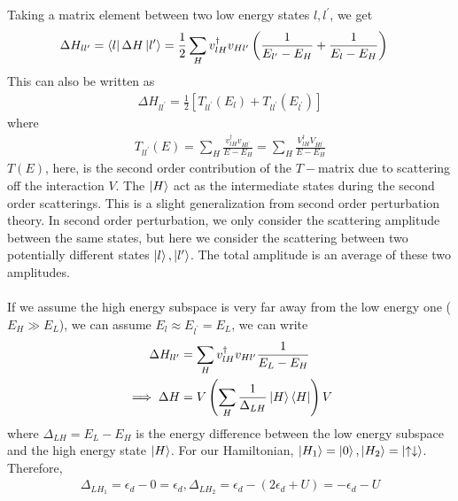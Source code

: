 \documentclass[twoside,11pt]{report}
\numberwithin{equation}{section}
\begin{document}
Taking a matrix element between two low energy states \(l, l^\prime\), we get
\begin{equation}\begin{aligned}
	\Delta H_{ll^\prime} = \bra{l} \Delta H \ket{l^\prime} &= \frac{1}{2}\sum_H v^\dagger_{lH}v_{Hl^\prime}\left(\frac{1}{E_{l^\prime} - E_H}+\frac{1}{E_l - E_H}\right)
\end{aligned}\end{equation}
This can also be written as
\begin{equation}\begin{aligned}
	\label{hamtmat}
	\Delta H_{ll^\prime} = \frac{1}{2}\left[T_{ll^\prime}(E_l) + T_{ll^\prime}(E_{l^\prime})\right]
\end{aligned}\end{equation}
where 
\begin{equation}\begin{aligned}
T_{ll^\prime}(E) = \sum_H \frac{v^\dagger_{lH}v_{Hl^\prime}}{E-E_H} = \sum_H \frac{V^\dagger_{lH} V_{Hl^\prime}}{E-E_H}
\end{aligned}\end{equation}
\(T(E)\), here, is the second order contribution of the \(T-\)matrix due to scattering off the interaction \(V\).
The \(\ket{H}\) act as the intermediate states during the second order scatterings.
This is a slight generalization from second order perturbation theory.
In second order perturbation, we only consider the scattering amplitude between the same states, but here we consider the scattering between two potentially different states \(\ket{l},\ket{l^\prime}\).
The total amplitude is an average of these two amplitudes.
\\\\If we assume the high energy subspace is very far away from the low energy one (\(E_H \gg E_L\)), we can assume \(E_l \approx E_{l^\prime} = E_L\), we can write
\begin{equation}\begin{aligned}
\Delta H_{ll^\prime} &=\sum_H v^\dagger_{lH}v_{Hl^\prime}\frac{1}{E_L-E_H}\\
\implies \Delta H &=V \left(\sum_H \frac{1}{\Delta_{LH}}\ket{H}\bra{H}\right)V
\end{aligned}\end{equation}
where \(\Delta_{LH}=E_L - E_H\) is the energy difference between the low energy subspace and the high energy state \(\ket{H}\).
For our Hamiltonian, \(\ket{H_1} = \ket{0}, \ket{H_2} = \ket{\uparrow\downarrow}\).
Therefore,
\begin{equation}\begin{aligned}
	\Delta_{LH_1} = \epsilon_d - 0 = \epsilon_d, \Delta_{LH_2} = \epsilon_d - \left(2\epsilon_d + U\right) = -\epsilon_d - U
\end{aligned}\end{equation}
\end{document}
